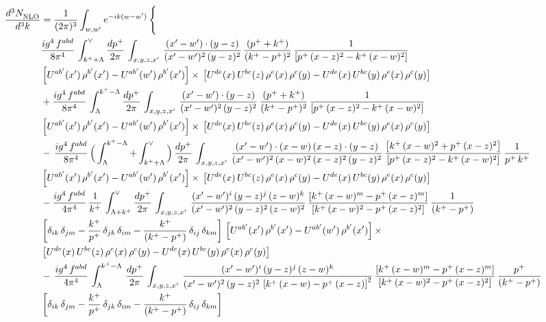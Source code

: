 \documentclass[9pt]{article}
\numberwithin{equation}{section}
\begin{document}
\begin{align}
    \frac{d^{3}N_{\rm NLO}^{\rm}}{d^{3}k}  & = \frac{1}{(2\pi)^{3}}  \int_{w, w^\prime} e^{-ik(w-w^\prime)}\, \Bigg\{\notag \\ &  \frac{ig^{4}\,f^{abd}}{8\pi^{4}}\,\int_{k^{+}+\Lambda}^{\vee}\frac{dp^{+}}{2\pi}\, \int_{x,y,z,x'}\, \frac{(x'-w')\cdot (y-z)}{(x'-w')^{2}\,(y-z)^{2}}\, \frac{(p^{+}+k^{+})}{(k^{+}-p^{+})^{2}}\, \frac{1}{\left[p^{+}\,(x-z)^{2}-k^{+}\,(x-w)^{2}\right]}\notag \\ & \left[U^{ab'}(x')\,\rho^{b'}(x')-U^{ab'}(w')\, \rho^{b'}(x')\right]\times\, \left[U^{de}(x)\,U^{bc}(z)\, \rho^{e}(x)\,\rho^{c}(y)-U^{de}(x)\,U^{bc}(y)\,\rho^{e}(x)\,\rho^{c}(y)\right]\notag \\ & + \frac{ig^{4}\,f^{abd}}{8\pi^{4}}\,\int_{\Lambda}^{k^{+}-\Lambda}\frac{dp^{+}}{2\pi}\, \int_{x,y,z,x'}\, \frac{(x'-w')\cdot (y-z)}{(x'-w')^{2}\,(y-z)^{2}}\, \frac{(p^{+}+k^{+})}{(k^{+}-p^{+})^{2}}\, \frac{1}{\left[p^{+}\,(x-z)^{2}-k^{+}\,(x-w)^{2}\right]}\notag \\ & \left[U^{ab'}(x')\,\rho^{b'}(x')-U^{ab'}(w')\, \rho^{b'}(x')\right]\times\, \left[U^{de}(x)\,U^{bc}(z)\, \rho^{e}(x)\,\rho^{c}(y)-U^{de}(x)\,U^{bc}(y)\,\rho^{e}(x)\,\rho^{c}(y)\right]\notag \\ & -\, \frac{ig^{4}\,f^{abd}}{8\pi^{4}}\, \Big(\int_{\Lambda}^{k^{+}-\Lambda}+\int_{k^{+}+\Lambda}^{\vee}\Big)\, \frac{dp^{+}}{2\pi}\, \int_{x,y,z,x'}\,\frac{(x'-w')\cdot (x-w)\, (x-z)\cdot (y-z)}{(x'-w')^{2}\, (x-w)^{2}\, (x-z)^{2}\, (y-z)^{2}}\, \frac{\left[k^{+}\,(x-w)^{2}+p^{+}\,(x-z)^{2}\right]}{\left[p^{+}\,(x-z)^{2}-k^{+}\,(x-w)^{2}\right]}\, \frac{1}{p^{+}\,k^{+}} \notag \\ & \left[U^{ab'}(x')\,\rho^{b'}(x')-U^{ab'}(w')\, \rho^{b'}(x')\right]\times\, \left[U^{de}(x)\,U^{bc}(z)\, \rho^{e}(x)\,\rho^{c}(y)-U^{de}(x)\,U^{bc}(y)\,\rho^{e}(x)\,\rho^{c}(y)\right]\notag \\ & -\frac{ig^{4}\, f^{abd}}{4\pi^{4}}\, \frac{1}{k^{+}}\,\int_{\Lambda + k^{+}}^{\vee}\frac{dp^{+}}{2\pi}\, \int_{x,y,z,x'}\,\frac{(x'-w')^{i}\, (y-z)^{j}\, (z-w)^{k}}{(x'-w')^{2}\, (y-z)^{2}\, (z-w)^{2}}\, \frac{\left[k^{+}\,(x-w)^{m}-p^{+}\,(x-z)^{m}\right]}{\left[k^{+}\,(x-w)^{2}-p^{+}\,(x-z)^{2}\right]}\,\frac{1}{(k^{+}-p^{+})}\notag \\ & \left[\delta_{ik}\, \delta_{jm} - \frac{k^{+}}{p^{+}}\, \delta_{jk}\, \delta_{im}-\frac{k^{+}}{(k^{+}-p^{+})}\, \delta_{ij}\,\delta_{km}\right]\, \left[U^{ab'}(x')\,\rho^{b'}(x')-U^{ab'}(w')\, \rho^{b'}(x')\right]\times\notag \\ & \left[U^{de}(x)\,U^{bc}(z)\, \rho^{e}(x)\,\rho^{c}(y)-U^{de}(x)\,U^{bc}(y)\,\rho^{e}(x)\,\rho^{c}(y)\right]\notag \\ & -\,\frac{ig^{4}\, f^{abd}}{4\pi^{4}}\, \int_{\Lambda}^{k^{+}-\Lambda}\,\frac{dp^{+}}{2\pi}\, \int_{x,y,z,x'}\,\frac{(x'-w')^{i}\, (y-z)^{j}\, (z-w)^{k}}{(x'-w')^{2}\, (y-z)^{2}\,\left[k^{+}\,(x-w)-p^{+}\,(x-z)\right]^{2}}\, \frac{\left[k^{+}\,(x-w)^{m}-p^{+}\,(x-z)^{m}\right]}{\left[k^{+}\,(x-w)^{2}-p^{+}\,(x-z)^{2}\right]}\,\frac{p^{+}}{(k^{+}-p^{+})}\notag \\ & \left[\delta_{ik}\, \delta_{jm} - \frac{k^{+}}{p^{+}}\, \delta_{jk}\, \delta_{im}-\frac{k^{+}}{(k^{+}-p^{+})}\, \delta_{ij}\,\delta_{km}\right]\, 
\end{align}
\end{document}
